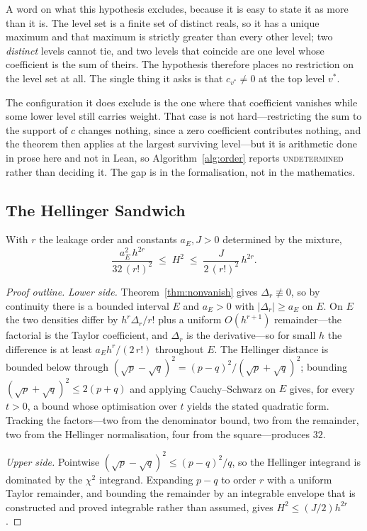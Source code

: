 A word on what this hypothesis excludes, because it is easy to state it as more than it is.
The level set is a finite set of distinct reals, so it has a unique maximum and that maximum
is strictly greater than every other level; two \emph{distinct} levels cannot tie, and two
levels that coincide are one level whose coefficient is the sum of theirs. The hypothesis
therefore places no restriction on the level set at all. The single thing it asks is that
$c_{v^{*}}\neq0$ at the top level $v^{*}$.

The configuration it does exclude is the one where that coefficient vanishes while some lower
level still carries weight. That case is not hard---restricting the sum to the support of $c$
changes nothing, since a zero coefficient contributes nothing, and the theorem then applies
at the largest surviving level---but it is arithmetic done in prose here and not in Lean, so
Algorithm~\ref{alg:order} reports \textsc{undetermined} rather than deciding it. The gap is
in the formalisation, not in the mathematics.

\subsection{The Hellinger Sandwich}
\label{sec:sandwich}

\begin{theorem}
\label{thm:sandwich}
With $r$ the leakage order and constants $a_{E},J>0$ determined by the mixture,
\begin{equation}
\frac{a_{E}^{2}\,h^{2r}}{32\,(r!)^{2}}\;\leq\;H^{2}\;\leq\;\frac{J}{2\,(r!)^{2}}\,h^{2r}.
\label{eq:sandwich}
\end{equation}
\end{theorem}

\begin{proof}[Proof outline]
\emph{Lower side.} Theorem~\ref{thm:nonvanish} gives $\Delta_{r}\not\equiv0$, so by
continuity there is a bounded interval $E$ and $a_{E}>0$ with $|\Delta_{r}|\ge a_{E}$ on
$E$. On $E$ the two densities differ by $h^{r}\Delta_{r}/r!$ plus a uniform $O(h^{r+1})$
remainder---the factorial is the Taylor coefficient, and $\Delta_{r}$ is the derivative---so
for small $h$ the difference is at least $a_{E}h^{r}/(2\,r!)$ throughout $E$. The
Hellinger distance is bounded below through
$(\sqrt{p}-\sqrt{q})^{2}=(p-q)^{2}/(\sqrt{p}+\sqrt{q})^{2}$; bounding
$(\sqrt{p}+\sqrt{q})^{2}\le2(p+q)$ and applying Cauchy--Schwarz on $E$ gives, for every
$t>0$, a bound whose optimisation over $t$ yields the stated quadratic form. Tracking the
factors---two from the denominator bound, two from the remainder, two from the Hellinger
normalisation, four from the square---produces $32$.

\emph{Upper side.} Pointwise $(\sqrt{p}-\sqrt{q})^{2}\le(p-q)^{2}/q$, so the Hellinger
integrand is dominated by the $\chi^{2}$ integrand. Expanding $p-q$ to order $r$ with a
uniform Taylor remainder, and bounding the remainder by an integrable envelope that is
constructed and proved integrable rather than assumed, gives $H^{2}\le(J/2)h^{2r}$.
\end{proof}


